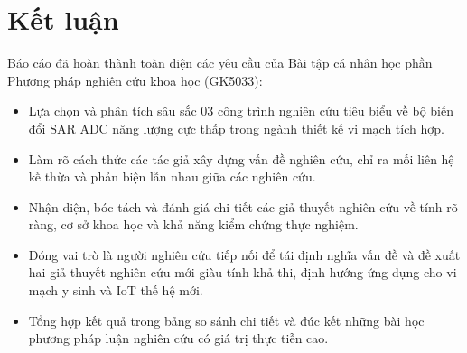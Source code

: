 \documentclass[12pt,a4paper]{article}
\begin{document}
\section{Kết luận}
Báo cáo đã hoàn thành toàn diện các yêu cầu của Bài tập cá nhân học phần Phương pháp nghiên cứu khoa học (GK5033):
\begin{itemize}
    \item Lựa chọn và phân tích sâu sắc 03 công trình nghiên cứu tiêu biểu về bộ biến đổi SAR ADC năng lượng cực thấp trong ngành thiết kế vi mạch tích hợp.
    \item Làm rõ cách thức các tác giả xây dựng vấn đề nghiên cứu, chỉ ra mối liên hệ kế thừa và phản biện lẫn nhau giữa các nghiên cứu.
    \item Nhận diện, bóc tách và đánh giá chi tiết các giả thuyết nghiên cứu về tính rõ ràng, cơ sở khoa học và khả năng kiểm chứng thực nghiệm.
    \item Đóng vai trò là người nghiên cứu tiếp nối để tái định nghĩa vấn đề và đề xuất hai giả thuyết nghiên cứu mới giàu tính khả thi, định hướng ứng dụng cho vi mạch y sinh và IoT thế hệ mới.
    \item Tổng hợp kết quả trong bảng so sánh chi tiết và đúc kết những bài học phương pháp luận nghiên cứu có giá trị thực tiễn cao.
\end{itemize}
\end{document}
